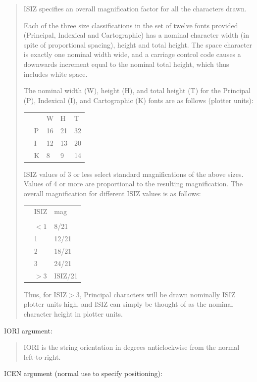 \documentclass[twoside,11pt]{article}
\renewcommand{\_}{\texttt{\symbol{95}}}
\begin{document}
\begin{quote}
ISIZ specifies an overall magnification factor for all the characters drawn.

Each of the three size classifications in the set of twelve
fonts provided (Principal, Indexical and Cartographic) has a
nominal character width (in spite of proportional spacing),
height and total height.  The space character is exactly one
nominal width wide, and a carriage control code causes
a downwards increment equal to the nominal total height, which
thus includes white space.

The nominal width (W), height (H), and total height (T) for
the Principal (P), Indexical (I), and Cartographic (K) fonts
are as follows (plotter units):

\begin{tabular}{lllll}
 &  & W & H & T\\
 & P & 16 & 21 & 32\\
 & I & 12 & 13 & 20\\
 & K & 8 & 9 & 14
\end{tabular}

ISIZ values of 3 or less select standard magnifications of the
above sizes.  Values of 4 or more are proportional to the
resulting magnification.  The overall magnification for
different ISIZ values is as follows:

\begin{tabular}{lll}
 & ISIZ & mag\\
\\
 & $<1$ & 8/21\\
 & 1 & 12/21\\
 & 2 & 18/21\\
 & 3 & 24/21\\
 & $>3$ & ISIZ/21\\
\end{tabular}

Thus, for ISIZ$>$3, Principal characters will be drawn nominally
ISIZ plotter units high, and ISIZ can simply be thought of
as the nominal character height in plotter units.
\end{quote}

IORI argument:

\begin{quote}
IORI is the string orientation in degrees anticlockwise from the normal
left-to-right.
\end{quote}

ICEN argument (normal use to specify positioning):
\end{document}
